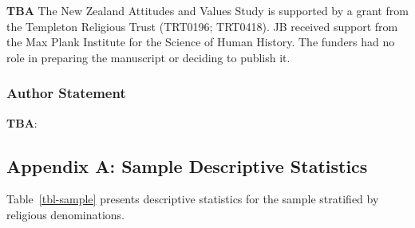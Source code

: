 \documentclass[
  single column]{article}
\begin{document}
\textbf{TBA} The New Zealand Attitudes and Values Study is supported by
a grant from the Templeton Religious Trust (TRT0196; TRT0418). JB
received support from the Max Plank Institute for the Science of Human
History. The funders had no role in preparing the manuscript or deciding
to publish it.

\subsubsection{Author Statement}\label{author-statement}

\textbf{TBA}:

\newpage{}

\subsection{Appendix A: Sample Descriptive Statistics}\label{appendix-a}

Table~\ref{tbl-sample} presents descriptive statistics for the sample
stratified by religious denominations.

\newpage{}
\end{document}
